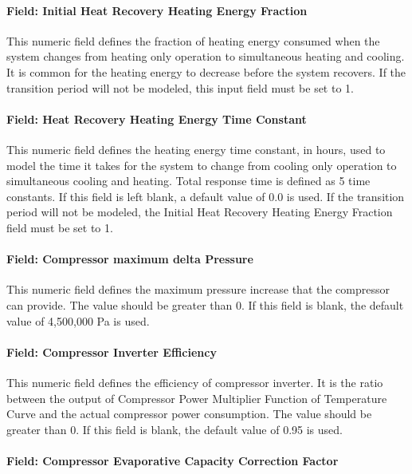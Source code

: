 \paragraph{Field: Initial Heat Recovery Heating Energy Fraction}

This numeric field defines the fraction of heating energy consumed when the system changes from heating only operation to simultaneous heating and cooling. It is common for the heating energy to decrease before the system recovers. If the transition period will not be modeled, this input field must be set to 1.

\paragraph{Field: Heat Recovery Heating Energy Time Constant}

This numeric field defines the heating energy time constant, in hours, used to model the time it takes for the system to change from cooling only operation to simultaneous cooling and heating. Total response time is defined as 5 time constants. If this field is left blank, a default value of 0.0 is used. If the transition period will not be modeled, the Initial Heat Recovery Heating Energy Fraction field must be set to 1.

\paragraph{Field: Compressor maximum delta Pressure}

This numeric field defines the maximum pressure increase that the compressor can provide. The value should be greater than 0. If this field is blank, the default value of 4,500,000 Pa is used.

\paragraph{Field: Compressor Inverter Efficiency}

This numeric field defines the efficiency of compressor inverter. It is the ratio between the output of Compressor Power Multiplier Function of Temperature Curve and the actual compressor power consumption. The value should be greater than 0. If this field is blank, the default value of 0.95 is used.

\paragraph{Field: Compressor Evaporative Capacity Correction Factor}

